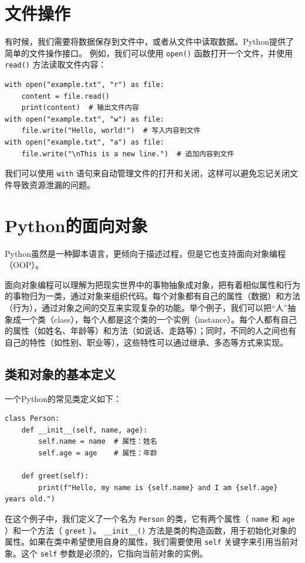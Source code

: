 \section{文件操作}

有时候，我们需要将数据保存到文件中，或者从文件中读取数据。Python提供了简单的文件操作接口。
例如，我们可以使用 \texttt{open()} 函数打开一个文件，并使用 \texttt{read()} 方法读取文件内容：
\begin{verbatim}
with open("example.txt", "r") as file:
    content = file.read()
    print(content)  # 输出文件内容
with open("example.txt", "w") as file:
    file.write("Hello, world!")  # 写入内容到文件
with open("example.txt", "a") as file:
    file.write("\nThis is a new line.")  # 追加内容到文件
\end{verbatim}

我们可以使用 \texttt{with} 语句来自动管理文件的打开和关闭，这样可以避免忘记关闭文件导致资源泄漏的问题。

\section{Python的面向对象}

Python虽然是一种脚本语言，更倾向于描述过程，但是它也支持面向对象编程（OOP）。

面向对象编程可以理解为把现实世界中的事物抽象成对象，把有着相似属性和行为的事物归为一类，通过对象来组织代码。每个对象都有自己的属性（数据）和方法（行为），通过对象之间的交互来实现复杂的功能。举个例子，我们可以把“人”抽象成一个类（class），每个人都是这个类的一个实例（instance）。每个人都有自己的属性（如姓名、年龄等）和方法（如说话、走路等）；同时，不同的人之间也有自己的特性（如性别、职业等），这些特性可以通过继承、多态等方式来实现。

\subsection{类和对象的基本定义}
一个Python的常见类定义如下：
\begin{verbatim}
class Person:
    def __init__(self, name, age):
        self.name = name  # 属性：姓名
        self.age = age    # 属性：年龄

    def greet(self):
        print(f"Hello, my name is {self.name} and I am {self.age} years old.")
\end{verbatim}
在这个例子中，我们定义了一个名为 \texttt{Person} 的类，它有两个属性（ \texttt{name} 和 \texttt{age} ）和一个方法（ \texttt{greet} ）。 \texttt{\_\_init\_\_()} 方法是类的构造函数，用于初始化对象的属性。如果在类中希望使用自身的属性，我们需要使用 \texttt{self} 关键字来引用当前对象。这个 \texttt{self} 参数是必须的，它指向当前对象的实例。

